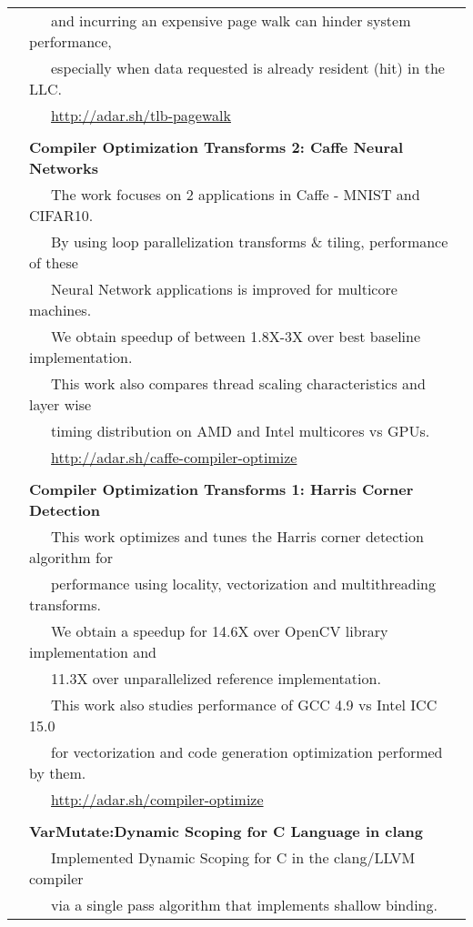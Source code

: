 \documentclass[a4paper,10pt]{article} %
\begin{document}
\begin{tabular}{rl}
& ~~~and incurring an expensive page walk can hinder system performance,\\
& ~~~especially when data requested is already resident (hit) in the LLC.\\
& ~~~\href{http://adar.sh/tlb-pagewalk}{http://adar.sh/tlb-pagewalk}\\
& \\
& \textbf{Compiler Optimization Transforms 2: Caffe Neural Networks}\\
& ~~~The work focuses on 2 applications in Caffe - MNIST and CIFAR10. \\
& ~~~By using loop parallelization transforms \& tiling, performance of these \\
& ~~~Neural Network applications is improved for multicore machines. \\
& ~~~We obtain speedup of between 1.8X-3X over best baseline implementation.\\
& ~~~This work also compares thread scaling characteristics and layer wise \\
& ~~~timing distribution on AMD and Intel multicores vs GPUs.\\
& ~~~\href{http://adar.sh/caffe-compiler-optimize}{http://adar.sh/caffe-compiler-optimize}\\
& \\
& \textbf{Compiler Optimization Transforms 1: Harris Corner Detection}\\
& ~~~This work optimizes and tunes the Harris corner detection algorithm for \\
& ~~~performance using locality, vectorization and multithreading transforms. \\
& ~~~We obtain a speedup for 14.6X over OpenCV library implementation and \\
& ~~~11.3X over unparallelized reference implementation.\\
& ~~~This work also studies performance of GCC 4.9 vs Intel ICC 15.0\\
& ~~~for vectorization and code generation optimization performed by them.\\
& ~~~\href{http://adar.sh/compiler-optimize}{http://adar.sh/compiler-optimize}\\
& \\
& \textbf{VarMutate:Dynamic Scoping for C Language in clang}\\
& ~~~Implemented Dynamic Scoping for C in the clang/LLVM compiler\\
& ~~~via a single pass algorithm that implements shallow binding.\\

\end{tabular}
\end{document}

